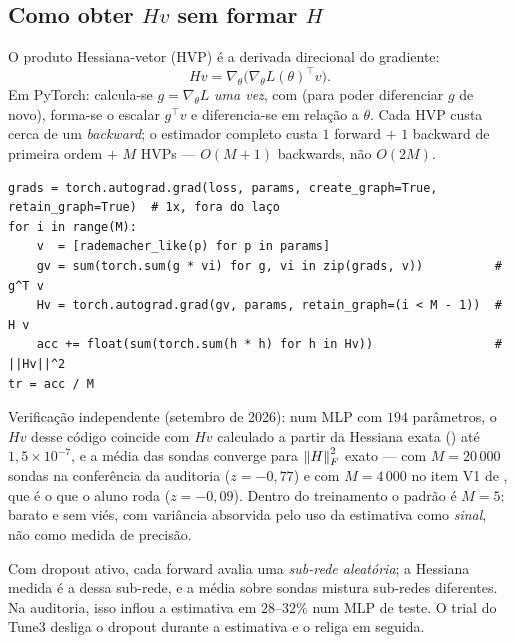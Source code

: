 \subsection{Como obter \texorpdfstring{$Hv$}{Hv} sem formar \texorpdfstring{$H$}{H}}
O produto Hessiana-vetor (HVP) é a derivada direcional do gradiente:
\[
Hv=\nabla_\theta\big(\nabla_\theta L(\theta)^\top v\big).
\]
Em PyTorch: calcula-se $g=\nabla_\theta L$ \emph{uma vez}, com  (para poder diferenciar $g$ de novo), forma-se o escalar $g^\top v$ e diferencia-se em relação a $\theta$. Cada HVP custa cerca de um \emph{backward}; o estimador completo custa $1$ forward $+$ $1$ backward de primeira ordem $+$ $M$ HVPs --- $O(M+1)$ backwards, não $O(2M)$.

\begin{codigo}
\begin{lstlisting}
grads = torch.autograd.grad(loss, params, create_graph=True, retain_graph=True)  # 1x, fora do laço
for i in range(M):
    v  = [rademacher_like(p) for p in params]
    gv = sum(torch.sum(g * vi) for g, vi in zip(grads, v))          # g^T v
    Hv = torch.autograd.grad(gv, params, retain_graph=(i < M - 1))  # H v
    acc += float(sum(torch.sum(h * h) for h in Hv))                 # ||Hv||^2
tr = acc / M
\end{lstlisting}
Verificação independente (setembro de 2026): num MLP com $194$ parâmetros, o $Hv$ desse código coincide com $Hv$ calculado a partir da Hessiana exata () até $1{,}5\times10^{-7}$, e a média das sondas converge para $\left\lVert H \right\rVert_F^2$ exato --- com $M=20\,000$ sondas na conferência da auditoria ($z=-0{,}77$) e com $M=4\,000$ no item V1 de , que é o que o aluno roda ($z=-0{,}09$). Dentro do treinamento o padrão é $M=5$: barato e sem viés, com variância absorvida pelo uso da estimativa como \emph{sinal}, não como medida de precisão.
\end{codigo}

\begin{alerta}
Com dropout ativo, cada forward avalia uma \emph{sub-rede aleatória}; a Hessiana medida é a dessa sub-rede, e a média sobre sondas mistura sub-redes diferentes. Na auditoria, isso inflou a estimativa em $28$--$32\%$ num MLP de teste. O trial do Tune3 desliga o dropout durante a estimativa e o religa em seguida.
\end{alerta}

